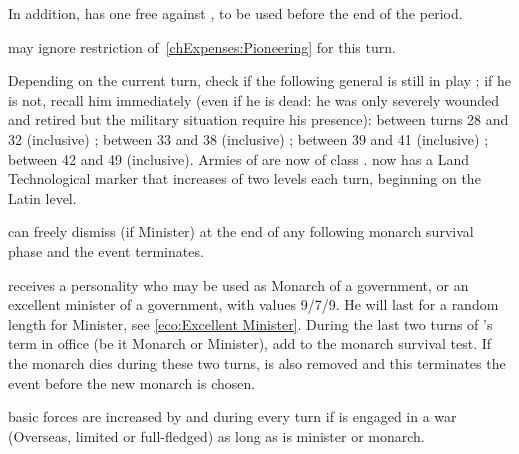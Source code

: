 \aparag In addition, \ENG has one free \OCB against \HOL, to be used before
the end of the period.

\phadm
\aparag \ENG may ignore restriction of~\ref{chExpenses:Pioneering} for this
turn.





\phevnt
\aparag Depending on the current turn, check if the following general is still
in play ; if he is not, recall him immediately (even if he is dead: he was
only severely wounded and retired but the military situation require his
presence):
\bparag \leaderPappenheim between turns 28 and 32 (inclusive) ;
\bparag \leaderMontecuccoli between 33 and 38 (inclusive) ;
\bparag {} between 39 and 41 (inclusive) ;
\bparag {} between 42 and 49 (inclusive).
\aparag Armies of \AUSaus are now of class \CAIV.
\aparag \AUSMin now has a Land Technological marker that increases of two
levels each turn, beginning on the Latin level.





\aparag \HOL can freely dismiss  (if Minister) at the
end of any following monarch survival phase and the event terminates.

\phevnt
\aparag \HOL receives a personality  who may be used as
Monarch of a  government, or an excellent minister of a
 government, with values 9/7/9.  He will last for a random
length for Minister, see \ref{eco:Excellent Minister}.
\aparag During the last two turns of 's term in office (be
it Monarch or Minister), add  to the monarch survival test.  If the
monarch dies during these two turns,  is also removed and
this terminates the event before the new monarch is chosen.

\phadm
\aparag \HOL basic forces are increased by \FLEET\facemoins and \ARMY\faceplus
during every turn if is engaged in a war (Overseas, limited or full-fledged)
as long as  is minister or monarch.



